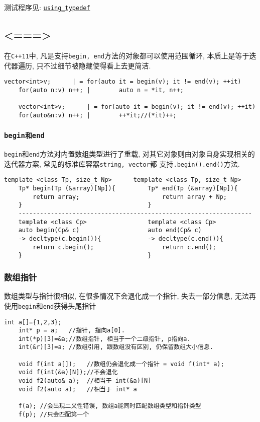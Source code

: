 测试程序见: \href{https://github.com/wenqingqian/Obtuse/blob/main/test/cpp/c++11/using_typedef.cpp}{\tt using\_typedef}
\subsection{<===>\color{purple}{范围循环}}
在{\tt C++11}中, 凡是支持{\tt begin, end}方法的对象都可以使用范围循环, 本质上是等于迭代器遍历, 
	只不过细节被隐藏使得看上去更简洁.
\begin{lstlisting}[xleftmargin=2em,xrightmargin=2em]
	vector<int>v;      | = for(auto it = begin(v); it != end(v); ++it)
	for(auto n:v) n++; |		auto n = *it, n++;
		
	vector<int>v;      | = for(auto it = begin(v); it != end(v); ++it)
	for(auto&n:v) n++; |		++*it;//(*it)++;
\end{lstlisting}
\subsubsection{\tt{begin}和\tt{end}}
{\tt begin}和{\tt end}方法对内置数组类型进行了重载, 对其它对象则由对象自身实现相关的迭代器方案, 常见的标准库容器{\tt string, vector}都
	支持{\tt .begin().end()}方法.

\begin{lstlisting}[xleftmargin=2em,xrightmargin=2em,title=部分impl]
	template <class Tp, size_t Np>   	template <class Tp, size_t Np> 
	Tp* begin(Tp (&array)[Np]){			Tp* end(Tp (&array)[Np]){
		return array;						return array + Np;
	}									}
    -----------------------------------------------------------------
	template <class Cp>					template <class Cp>
	auto begin(Cp& c) 					auto end(Cp& c) 
	-> decltype(c.begin()){				-> decltype(c.end()){
		return c.begin();					return c.end();
	}									}
\end{lstlisting}
\subsubsection{数组指针}
数组类型与指针很相似, 在很多情况下会退化成一个指针, 失去一部分信息, 无法再使用{\tt begin}和{\tt end}获得头尾指针

\begin{lstlisting}[xleftmargin=2em,xrightmargin=2em]
	int a[]={1,2,3};
	int* p = a;   //指针, 指向a[0].
	int(*p)[3]=&a;//数组指针, 相当于一个二级指针, p指向a.
	int(&r)[3]=a; //数组引用, 跟数组没有区别, 仍保留数组大小信息.

	void f(int a[]);   //数组仍会退化成一个指针 = void f(int* a);
	void f(int(&a)[N]);//不会退化
	void f2(auto& a);  //相当于 int(&a)[N]
	void f2(auto a);   //相当于 int* a

	f(a); //会出现二义性错误, 数组a能同时匹配数组类型和指针类型
	f(p); //只会匹配第一个
\end{lstlisting}

